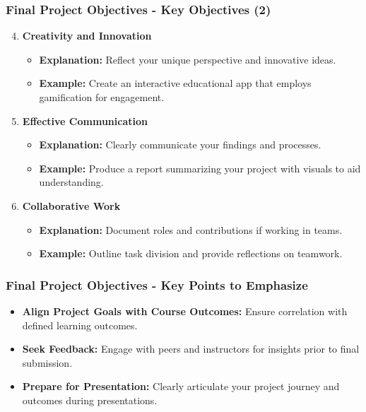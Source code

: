 \documentclass{beamer}
\begin{document}
\begin{frame}[fragile]
    \frametitle{Final Project Objectives - Key Objectives (2)}
    \begin{enumerate}
        \setcounter{enumi}{3}
        \item \textbf{Creativity and Innovation}
        \begin{itemize}
            \item \textbf{Explanation:} Reflect your unique perspective and innovative ideas.
            \item \textbf{Example:} Create an interactive educational app that employs gamification for engagement.
        \end{itemize}
        
        \item \textbf{Effective Communication}
        \begin{itemize}
            \item \textbf{Explanation:} Clearly communicate your findings and processes.
            \item \textbf{Example:} Produce a report summarizing your project with visuals to aid understanding.
        \end{itemize}

        \item \textbf{Collaborative Work}
        \begin{itemize}
            \item \textbf{Explanation:} Document roles and contributions if working in teams.
            \item \textbf{Example:} Outline task division and provide reflections on teamwork.
        \end{itemize}
    \end{enumerate}
\end{frame}

\begin{frame}[fragile]
    \frametitle{Final Project Objectives - Key Points to Emphasize}
    \begin{itemize}
        \item \textbf{Align Project Goals with Course Outcomes:} Ensure correlation with defined learning outcomes.
        \item \textbf{Seek Feedback:} Engage with peers and instructors for insights prior to final submission.
        \item \textbf{Prepare for Presentation:} Clearly articulate your project journey and outcomes during presentations.
    \end{itemize}
\end{frame}
\end{document}
